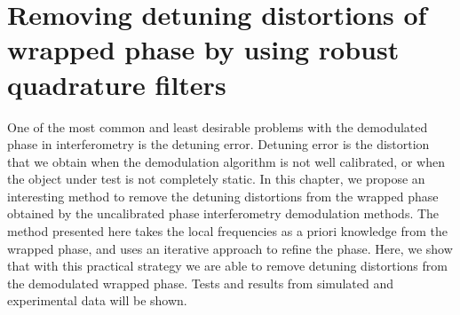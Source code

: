 \chapter{Removing detuning distortions of wrapped phase by using robust 
 quadrature filters}

One of the most common and least desirable problems with the 
demodulated phase in interferometry is the detuning error. Detuning error is 
the distortion that we obtain when the demodulation algorithm is not well 
calibrated, or when the object under test is not completely static. In this 
chapter, we propose an interesting method to remove the detuning distortions from 
the wrapped phase obtained by the uncalibrated phase interferometry 
demodulation methods. The method presented here takes the local frequencies as 
a priori knowledge from the wrapped phase, and uses an iterative approach to 
refine the phase. Here, we show that with this practical strategy we are able 
to remove detuning distortions from the demodulated wrapped phase. Tests and
results from simulated and experimental data will be shown.

 



